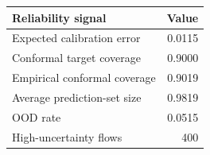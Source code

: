 \begin{tabular}{lr}
\hline
Reliability signal & Value \\
\hline
Expected calibration error & 0.0115 \\
Conformal target coverage & 0.9000 \\
Empirical conformal coverage & 0.9019 \\
Average prediction-set size & 0.9819 \\
OOD rate & 0.0515 \\
High-uncertainty flows & 400 \\
\hline
\end{tabular}
